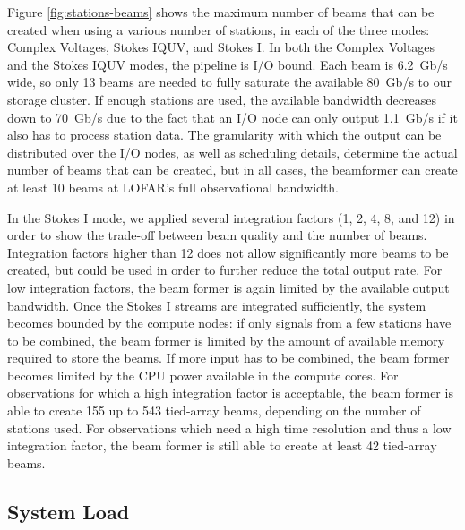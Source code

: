 \documentclass{llncs}
\begin{document}
Figure \ref{fig:stations-beams} shows the maximum number of beams that can be created when using a various number of stations, in each of the three modes: Complex Voltages, Stokes IQUV, and Stokes I. In both the Complex Voltages and the Stokes IQUV modes, the pipeline is I/O bound. Each beam is 6.2~Gb/s wide, so only 13 beams are needed to fully saturate the available 80~Gb/s to our storage cluster. If enough stations are used, the available bandwidth decreases down to 70~Gb/s due to the fact that an I/O node can only output 1.1~Gb/s if it also has to process station data. The granularity with which the output can be distributed over the I/O nodes, as well as scheduling details, determine the actual number of beams that can be created, but in all cases, the beamformer can create at least 10 beams at LOFAR's full observational bandwidth.

In the Stokes I mode, we applied several integration factors (1, 2, 4, 8, and 12) in order to show the trade-off between beam quality and the number of beams. Integration factors higher than 12 does not allow significantly more beams to be created, but could be used in order to further reduce the total output rate. For low integration factors, the beam former is again limited by the available output bandwidth. Once the Stokes I streams are integrated sufficiently, the system becomes bounded by the compute nodes: if only signals from a few stations have to be combined, the beam former is limited by the amount of available memory required to store the beams. If more input has to be combined, the beam former becomes limited by the CPU power available in the compute cores. For observations for which a high integration factor is acceptable, the beam former is able to create 155 up to 543 tied-array beams, depending on the number of stations used. For observations which need a high time resolution and thus a low integration factor, the beam former is still able to create at least 42 tied-array beams.

\subsection{System Load}
\end{document}

